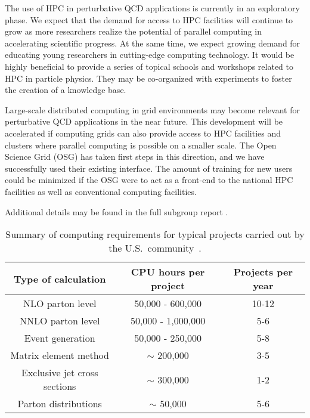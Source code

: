 The use of HPC in perturbative QCD applications is currently in
an exploratory phase. We expect that the demand for access to HPC
facilities will continue to grow as more researchers realize the 
potential of parallel computing in accelerating scientific progress. 
At the same time, we expect growing demand for educating young researchers 
in cutting-edge computing technology. It would be highly beneficial 
to provide a series of topical schools and workshops related 
to HPC in particle physics. They may be co-organized with experiments to foster 
the creation of a knowledge base.

Large-scale distributed computing in grid environments 
may become relevant for perturbative QCD applications 
in the near future. This development will be accelerated if computing grids
can also provide access to HPC facilities and clusters where parallel 
computing is possible on a smaller scale. The Open Science Grid (OSG)
has taken first steps in this direction, and we have successfully used their
existing interface. The amount of training for new users could be minimized
if the OSG were to act as a front-end to the national HPC facilities
as well as conventional computing facilities.

Additional details may be found in the full subgroup report \cite{Hoche:2013zja}.

\begin{table}
\begin{center}
  \begin{tabular}{ccc}
    \hline
    Type of calculation & CPU hours per project & Projects per year \\
    \hline\hline
    NLO parton level & 50,000 - 600,000 & 10-12\\
    NNLO parton level & 50,000 - 1,000,000 & 5-6\\
    Event generation & 50,000 - 250,000 & 5-8\\
    Matrix element method & $\sim$ 200,000 & 3-5\\
    Exclusive jet cross sections & $\sim$ 300,000 & 1-2\\
    Parton distributions & $\sim$ 50,000 & 5-6\\
    \hline
  \end{tabular}
\end{center}
  \caption{Summary of computing requirements for typical projects
    carried out by the U.S.~community~\cite{HPCWP}.
    \label{tab:summary}}
\end{table}


